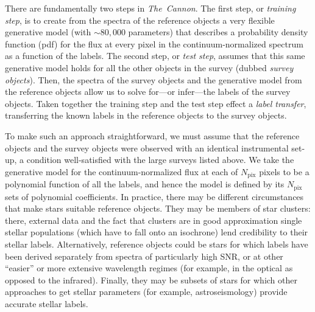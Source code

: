 \documentclass[12pt, preprint]{aastex}
\newcommand{\tc}{\textsl{The~Cannon}}
\newcommand{\pix}{\mathrm{pix}}
\begin{document}
There are fundamentally two steps in \tc. 
The first step, or \textit{training step}, is to create from the spectra of the reference objects a very flexible generative model (with $\sim 80,000$ parameters) that describes a probability density function (pdf) for the flux at every pixel in the continuum-normalized spectrum as a function of the labels.
The second step, or \textit{test step}, assumes that this same generative model holds for all the other objects in the survey (dubbed \textit{survey objects}). 
Then, the spectra of the survey objects and the generative model from the reference objects
allow us to solve for---or infer---the labels of the survey objects. 
Taken together the training step and the test step effect a \textit{label transfer},
transferring the known labels in the reference objects to the survey objects.

To make such an approach straightforward, we must assume that the reference objects and the survey objects were observed with an identical instrumental set-up, a condition well-satisfied with the large surveys listed above. 
We take the generative model for the continuum-normalized flux at each of $N_\pix$ pixels to be a polynomial function of all the labels, and hence the model is defined by its $N_\pix$ sets of polynomial coefficients. In practice, there may be different circumstances that make stars suitable reference objects. 
They may be members of star clusters: there, external data and the fact that clusters are in good approximation single stellar populations (which have to fall onto an isochrone) lend credibility to their stellar labels. 
Alternatively, reference objects could be stars for which labels have been derived separately from spectra of particularly high SNR, or at other ``easier'' or more extensive wavelength regimes (for example, in the optical as opposed to the infrared).  Finally, they may be subsets of stars for which other approaches to get stellar parameters (for example, astroseismology) provide accurate stellar labels.
\end{document}
